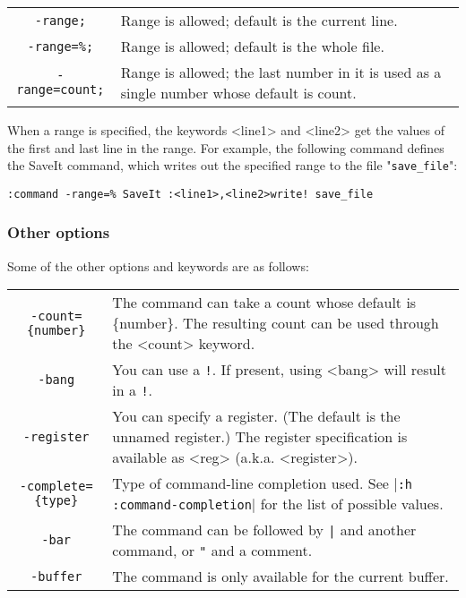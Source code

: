 {\begin{center} \begin{tabularx}{\textwidth}{c X}
				\texttt{-range;} & Range is allowed; default is the current line. \\
				\texttt{-range=\%;} & Range is allowed; default is the whole file. \\
				\texttt{-range={count};} & Range is allowed; the last number in it is used as a single number whose default is {count}. \\
\end{tabularx} \end{center}

When a range is specified, the keywords <line1> and <line2> get the values of the first and last line in the range.
For example, the following command defines the SaveIt command, which writes out the specified range to the file "\verb!save_file!":

\begin{Verbatim}[samepage=true]
 :command -range=% SaveIt :<line1>,<line2>write! save_file
\end{Verbatim}
\subsubsection{Other options}
Some of the other options and keywords are as follows:

\begin{center} \begin{tabularx}{\textwidth}{c X}
				\texttt{-count=\{number\}} & The command can take a count whose default is \{number\}.
				The resulting count can be used through the <count> keyword. \\
				\texttt{-bang} & You can use a \texttt{!}.
				If present, using <bang> will result in a \texttt{!}. \\
				\texttt{-register} & You can specify a register.
				(The default is the unnamed register.)
				The register specification is available as <reg> (a.k.a. <register>). \\
				\texttt{-complete=\{type\}} & Type of command-line completion used.  See |\texttt{:h :command-completion}| for the list of possible values. \\
				\texttt{-bar} & The command can be followed by \texttt{|} and another command, or \texttt{"} and a comment. \\
				\texttt{-buffer} & The command is only available for the current buffer. \\
\end{tabularx} \end{center}

}
